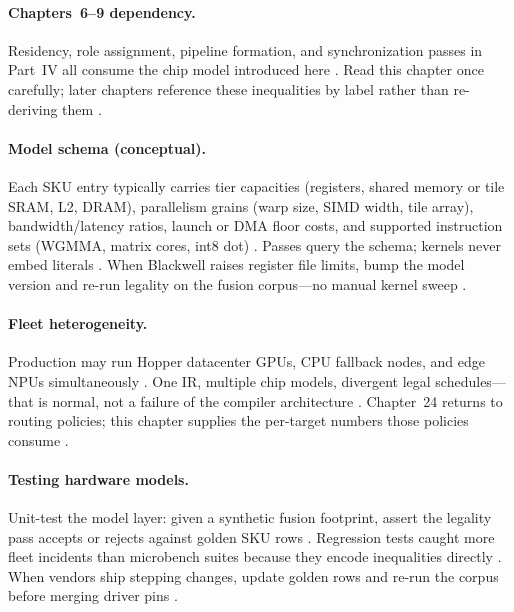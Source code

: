 \paragraph{Chapters~6--9 dependency.}
Residency, role assignment, pipeline formation, and synchronization passes in Part~IV all consume the chip model introduced here \citep{yirage2026,wu2024mirage}.
Read this chapter once carefully; later chapters reference these inequalities by label rather than re-deriving them \citep{nvidia2022hopper,amd2024xdna}.

\paragraph{Model schema (conceptual).}
Each SKU entry typically carries tier capacities (registers, shared memory or tile SRAM, L2, DRAM), parallelism grains (warp size, SIMD width, tile array), bandwidth/latency ratios, launch or DMA floor costs, and supported instruction sets (WGMMA, matrix cores, int8 dot) \citep{yirage2026,nvidia2022hopper,amd2024xdna}.
Passes query the schema; kernels never embed literals \citep{chen2020compilerbasedhardw}.
When Blackwell raises register file limits, bump the model version and re-run legality on the fusion corpus---no manual kernel sweep \citep{iree2024,patel2025llminference}.

\paragraph{Fleet heterogeneity.}
Production may run Hopper datacenter GPUs, CPU fallback nodes, and edge NPUs simultaneously \citep{patel2025llminference,amd2024aie}.
One IR, multiple chip models, divergent legal schedules---that is normal, not a failure of the compiler architecture \citep{yirage2026,wu2024mirage}.
Chapter~24 returns to routing policies; this chapter supplies the per-target numbers those policies consume \citep{memoryfloor2026}.

\paragraph{Testing hardware models.}
Unit-test the model layer: given a synthetic fusion footprint, assert the legality pass accepts or rejects against golden SKU rows \citep{yirage2026,chen2020compilerbasedhardw}.
Regression tests caught more fleet incidents than microbench suites because they encode inequalities directly \citep{patel2025llminference,memoryfloor2026}.
When vendors ship stepping changes, update golden rows and re-run the corpus before merging driver pins \citep{iree2024,nvidia2022hopper}.

